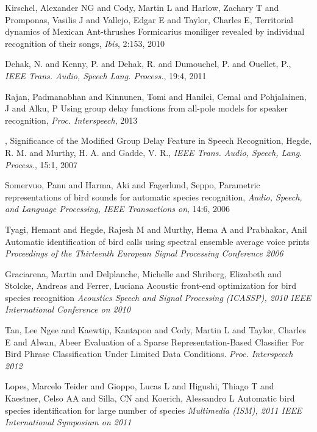 \documentclass{article}
\begin{document}
\begin{thebibliography}{100}
Kirschel, Alexander NG and Cody, Martin L and Harlow, Zachary T and Promponas,
Vasilis J and Vallejo, Edgar E and Taylor, Charles E,
Territorial dynamics of Mexican Ant-thrushes Formicarius moniliger revealed by
individual recognition of their songs, \emph{Ibis}, 2:153, 2010

Dehak, N. and Kenny, P. and Dehak, R. and Dumouchel, P. and Ouellet, P.,
\emph{IEEE Trans. Audio, Speech Lang. Process.}, 19:4, 2011

Rajan, Padmanabhan and Kinnunen, Tomi and Hanilci, Cemal and Pohjalainen, J and Alku, P
Using group delay functions from all-pole models for speaker recognition,
\emph{Proc. Interspeech}, 2013

,
Significance of the Modified Group Delay Feature in Speech Recognition,
Hegde, R. M. and Murthy, H. A. and Gadde, V. R.,
\emph{IEEE Trans. Audio, Speech, Lang. Process.},
15:1, 2007

Somervuo, Panu and Harma, Aki and Fagerlund, Seppo,
Parametric representations of bird sounds for automatic species recognition,
\emph{Audio, Speech, and Language Processing, IEEE Transactions on}, 14:6, 2006


Tyagi, Hemant and Hegde, Rajesh M and Murthy, Hema A and Prabhakar, Anil
Automatic identification of bird calls using spectral ensemble average voice prints
\emph{Proceedings of the Thirteenth European Signal Processing Conference 2006}

Graciarena, Martin and Delplanche, Michelle and Shriberg, Elizabeth and Stolcke, Andreas and Ferrer, Luciana
Acoustic front-end optimization for bird species recognition
\emph{Acoustics Speech and Signal Processing (ICASSP), 2010 IEEE International
Conference on 2010}

Tan, Lee Ngee and Kaewtip, Kantapon and Cody, Martin L and Taylor, Charles E and Alwan, Abeer
Evaluation of a Sparse Representation-Based Classifier For Bird Phrase Classification Under Limited Data Conditions.
\emph{Proc. Interspeech 2012}

Lopes, Marcelo Teider and Gioppo, Lucas L and Higushi, Thiago T and Kaestner, Celso AA and Silla, CN and Koerich, Alessandro L
Automatic bird species identification for large number of species
\emph{Multimedia (ISM), 2011 IEEE International Symposium on 2011}


\end{thebibliography}
\end{document}
